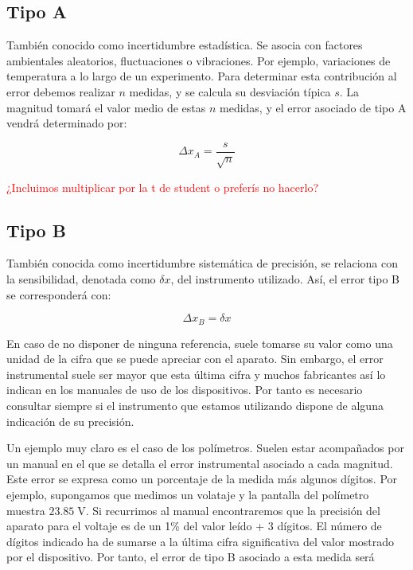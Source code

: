 \documentclass{book}
\begin{document}
\subsection{Tipo A}
También conocido como incertidumbre estadística. Se asocia con factores ambientales aleatorios, 
fluctuaciones o vibraciones. Por ejemplo, variaciones de temperatura a lo largo de un experimento.
Para determinar esta contribución al error debemos realizar $n$ medidas, y se calcula su desviación
típica $s$. La magnitud tomará el valor medio de estas $n$ medidas, y el error asociado de tipo A 
vendrá determinado por:

\begin{equation}
  \Delta x_A = \frac{s}{\sqrt{n}}
\end{equation}

\textcolor{red}{¿Incluimos multiplicar por la t de student o preferís no hacerlo?}

\subsection{Tipo B}
También conocida como incertidumbre sistemática de precisión, se relaciona con la sensibilidad,
denotada como $\delta x$, del instrumento utilizado. Así, el error tipo B se corresponderá con:

\begin{equation}
  \Delta x_B = \delta x
\end{equation}

En caso de no disponer de ninguna referencia, suele tomarse su valor como una unidad de la cifra 
que se puede apreciar con el aparato. Sin embargo, el error instrumental suele ser mayor que esta 
última cifra y muchos fabricantes así lo indican en los manuales de uso de los dispositivos. Por 
tanto es necesario consultar siempre si el instrumento que estamos utilizando dispone de alguna 
indicación de su precisión.

Un ejemplo muy claro es el caso de los polímetros. Suelen estar acompañados por un manual en
el que se detalla el error instrumental asociado a cada magnitud. Este error se expresa como un
porcentaje de la medida más algunos dígitos. Por ejemplo, supongamos que medimos un volataje y
la pantalla del polímetro muestra $23.85 \; \textrm{V}$. Si recurrimos al manual encontraremos que la precisión
del aparato para el voltaje es de un 1\% del valor leído + 3 dígitos. El número de dígitos indicado
ha de sumarse a la última cifra significativa del valor mostrado por el dispositivo. Por tanto, el error de tipo
B asociado a esta medida será
\end{document}
